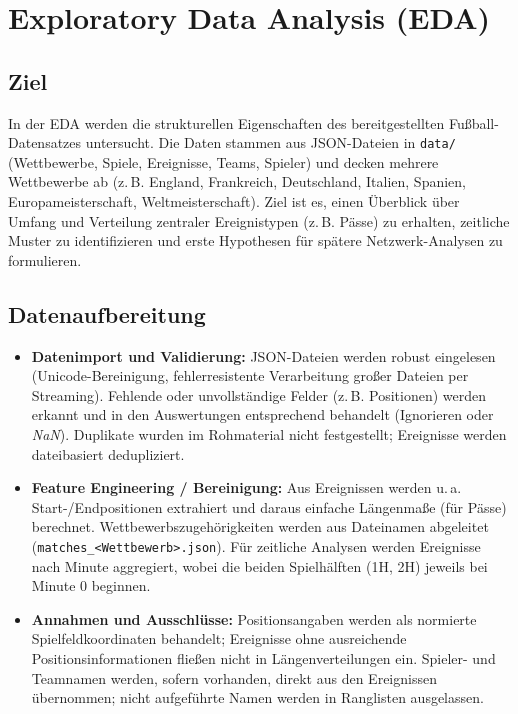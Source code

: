 \section{Exploratory Data Analysis (EDA)}

\subsection{Ziel}
In der EDA werden die strukturellen Eigenschaften des bereitgestellten Fußball-Datensatzes untersucht. Die Daten stammen aus JSON-Dateien in \texttt{data/} (Wettbewerbe, Spiele, Ereignisse, Teams, Spieler) und decken mehrere Wettbewerbe ab (z.\,B. England, Frankreich, Deutschland, Italien, Spanien, Europameisterschaft, Weltmeisterschaft). Ziel ist es, einen Überblick über Umfang und Verteilung zentraler Ereignistypen (z.\,B. Pässe) zu erhalten, zeitliche Muster zu identifizieren und erste Hypothesen für spätere Netzwerk-Analysen zu formulieren.

\subsection{Datenaufbereitung}
\begin{itemize}
  \item \textbf{Datenimport und Validierung:} JSON-Dateien werden robust eingelesen (Unicode-Bereinigung, fehlerresistente Verarbeitung großer Dateien per Streaming). Fehlende oder unvollständige Felder (z.\,B. Positionen) werden erkannt und in den Auswertungen entsprechend behandelt (Ignorieren oder \textit{NaN}). Duplikate wurden im Rohmaterial nicht festgestellt; Ereignisse werden dateibasiert dedupliziert.
  \item \textbf{Feature Engineering / Bereinigung:} Aus Ereignissen werden u.\,a. Start-/Endpositionen extrahiert und daraus einfache Längenmaße (für Pässe) berechnet. Wettbewerbszugehörigkeiten werden aus Dateinamen abgeleitet (\texttt{matches\_<Wettbewerb>.json}). Für zeitliche Analysen werden Ereignisse nach Minute aggregiert, wobei die beiden Spielhälften (1H, 2H) jeweils bei Minute 0 beginnen.
  \item \textbf{Annahmen und Ausschlüsse:} Positionsangaben werden als normierte Spielfeldkoordinaten behandelt; Ereignisse ohne ausreichende Positionsinformationen fließen nicht in Längenverteilungen ein. Spieler- und Teamnamen werden, sofern vorhanden, direkt aus den Ereignissen übernommen; nicht aufgeführte Namen werden in Ranglisten ausgelassen.
\end{itemize}

